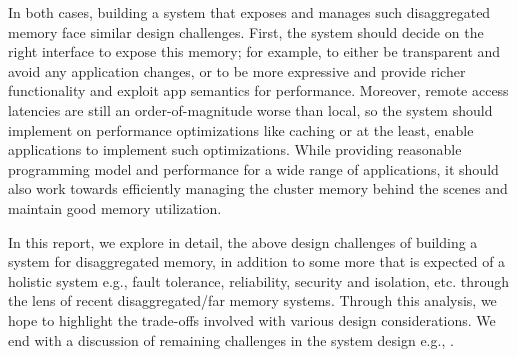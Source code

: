 In both cases, building a system 
that exposes and manages such disaggregated memory face  
similar design challenges. First, the system should decide on
the right interface to expose this memory; for example,
to either be transparent and avoid any application changes, 
or to be more expressive and provide richer functionality and 
exploit app semantics for performance. Moreover, remote access 
latencies are still an order-of-magnitude worse than local, so the 
system should implement on performance optimizations like caching 
or at the least, enable applications to implement such optimizations. 
While providing reasonable programming model and performance
for a wide range of applications, it should also work towards 
efficiently managing the cluster memory behind the scenes and 
maintain good memory utilization.

In this report, we explore in detail, the above design 
challenges of building a system for disaggregated memory, 
in addition to some more that is expected of a holistic 
system e.g., fault tolerance, reliability, security and 
isolation, etc. through the lens of recent 
disaggregated/far memory systems. 
Through this analysis, we hope to 
highlight the trade-offs involved with various design 
considerations. We end with a discussion of remaining 
challenges in the system design e.g., \todo{}.
